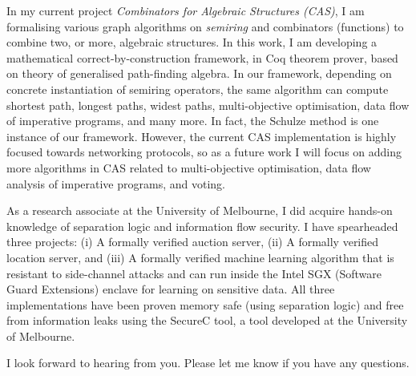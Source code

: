 \documentclass[11pt,a4paper,roman]{moderncv}
\begin{document}
\vspace{0.5cm}
In my current project \emph{Combinators for Algebraic Structures (CAS)},
I am formalising various graph algorithms on \emph{semiring} and combinators (functions) to 
combine two, or more, algebraic structures. In this work, I am developing 
a mathematical correct-by-construction  
framework, in Coq theorem prover, based on theory of generalised path-finding algebra. 
In our framework, depending on concrete instantiation 
of semiring operators, the same algorithm can compute shortest path, longest paths, 
widest paths, multi-objective optimisation, data flow of imperative programs, and many more. 
In fact, the Schulze method is one instance of our framework. However, 
the current CAS implementation is highly focused towards networking protocols,
so as a future work I will focus on adding more algorithms in CAS related 
to multi-objective optimisation, data flow analysis of imperative programs, and voting. 


As a research associate at the University of Melbourne, I did
 acquire hands-on knowledge of separation logic and information flow
 security. I have spearheaded three projects:
 (i) A formally verified auction server, (ii) A formally
 verified location server, and (iii) A formally verified machine learning 
 algorithm that is resistant to side-channel attacks and can  
 run inside the Intel SGX (Software Guard Extensions) enclave for learning
 on sensitive data. All three implementations have been proven 
 memory safe (using separation logic) and free from information
 leaks using the SecureC tool, a tool developed at the University of Melbourne.

I look forward to hearing from you. Please let me know if you have any questions. \\
 

\vspace{0.5cm}


\makeletterclosing
\end{document}
